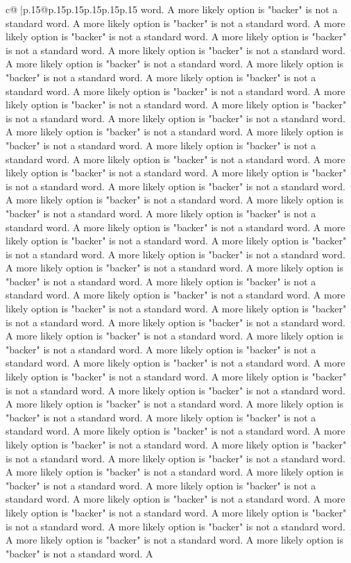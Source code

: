 \documentclass{article}
\begin{document}
{\begin{supertabular}{c@{$\;$}|p{.15\linewidth}@{}p{.15\linewidth}p{.15\linewidth}p{.15\linewidth}p{.15\linewidth}p{.15\linewidth}}
{{{word. A more likely option is "backer" is not a standard word. A more likely option is "backer" is not a standard word. A more likely option is "backer" is not a standard word. A more likely option is "backer" is not a standard word. A more likely option is "backer" is not a standard word. A more likely option is "backer" is not a standard word. A more likely option is "backer" is not a standard word. A more likely option is "backer" is not a standard word. A more likely option is "backer" is not a standard word. A more likely option is "backer" is not a standard word. A more likely option is "backer" is not a standard word. A more likely option is "backer" is not a standard word. A more likely option is "backer" is not a standard word. A more likely option is "backer" is not a standard word. A more likely option is "backer" is not a standard word. A more likely option is "backer" is not a standard word. A more likely option is "backer" is not a standard word. A more likely option is "backer" is not a standard word. A more likely option is "backer" is not a standard word. A more likely option is "backer" is not a standard word. A more likely option is "backer" is not a standard word. A more likely option is "backer" is not a standard word. A more likely option is "backer" is not a standard word. A more likely option is "backer" is not a standard word. A more likely option is "backer" is not a standard word. A more likely option is "backer" is not a standard word. A more likely option is "backer" is not a standard word. A more likely option is "backer" is not a standard word. A more likely option is "backer" is not a standard word. A more likely option is "backer" is not a standard word. A more likely option is "backer" is not a standard word. A more likely option is "backer" is not a standard word. A more likely option is "backer" is not a standard word. A more likely option is "backer" is not a standard word. A more likely option is "backer" is not a standard word. A more likely option is "backer" is not a standard word. A more likely option is "backer" is not a standard word. A more likely option is "backer" is not a standard word. A more likely option is "backer" is not a standard word. A more likely option is "backer" is not a standard word. A more likely option is "backer" is not a standard word. A more likely option is "backer" is not a standard word. A more likely option is "backer" is not a standard word. A more likely option is "backer" is not a standard word. A more likely option is "backer" is not a standard word. A more likely option is "backer" is not a standard word. A more likely option is "backer" is not a standard word. A more likely option is "backer" is not a standard word. A more likely option is "backer" is not a standard word. A more likely option is "backer" is not a standard word. A more likely option is "backer" is not a standard word. A more likely option is "backer" is not a standard word. A more likely option is "backer" is not a standard word. A more likely option is "backer" is not a standard word. A more likely option is "backer" is not a standard word. A more likely option is "backer" is not a standard word. A }}}
\end{supertabular}}
\end{document}
